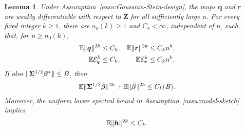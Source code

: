 \documentclass{article}
\theoremstyle{plain}
\newtheorem{lemma}[theorem]{Lemma}
\theoremstyle{definition}
\theoremstyle{definition}
\DeclarePairedDelimiter\norm{\lVert}{\rVert}
\def\E{{\mathbb{E}}}
\def\mathbold{\boldsymbol}
\def\bh{\mathbold{h}}\def\hhat{\widehat{h}}\def\htil{\widetilde{h}}
\def\bq{\mathbold{q}}\def\qhat{\widehat{q}}\def\qtil{\widetilde{q}}\def\qbar{{\overline q}}
\def\br{\mathbold{r}}\def\rhat{\widehat{r}}\def\rtil{\widetilde{r}}\def\rbar{{\overline r}}
\def\bZ{\mathbold{Z}}\def\hbZ{{\widehat{\bZ}}}\def\tbZ{{\widetilde{\bZ}}}
\def\bbeta{\mathbold{\beta}}\def\betahat{\widehat{\beta}}\def\hbeta{\widehat{\beta}}
\def\hbbeta{\hat{\bbeta}{}}
\def\bSigma{\mathbold{\Sigma}}\def\hbSigma{{\widehat{\bSigma}}}
\begin{document}
\begin{lemma}
\label{lem:balanced-moment-bounds}
Under Assumption~\ref{assu:Gaussian-Stein-design}, the maps $\bq$ and $\br$
are weakly differentiable with respect to $\bZ$ for all sufficiently
large $n$.
For every fixed integer $k\geq1$, there are $n_0(k)\geq1$ and
$C_k<\infty$, independent of $n$, such that, for $n\geq n_0(k)$,
\begin{align}
    \E\norm{\bq}^{2k}&\leq C_k,
    & \E\norm{\br}^{2k}&\leq C_kn^k,\notag\\
    \E\calE_{\bq}^{k}&\leq C_k,
    & \E\calE_{\br}^{k}&\leq C_kn^k.
    \label{eq:balanced-explicit-moment-bounds}
\end{align}
If also $\norm{\bSigma^{1/2}\bbeta^*}\leq B$, then
\begin{align*}
    \E\norm{\bSigma^{1/2}\hbbeta}^{2k}
    +\E\norm{\hbbeta}^{2k}
    \leq C_k(B).
\end{align*}
Moreover, the uniform lower spectral bound in
Assumption~\ref{assu:model-sketch} implies
\begin{align*}
    \E\norm{\bh}^{2k}\leq C_k.
\end{align*}
\end{lemma}
\end{document}
